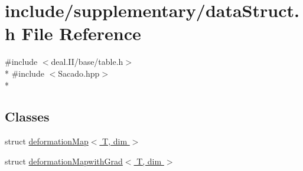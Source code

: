 \section{include/supplementary/data\-Struct.h File Reference}
\label{data_struct_8h}
{\ttfamily \#include $<$deal.\-I\-I/base/table.\-h$>$}\\*
{\ttfamily \#include $<$Sacado.\-hpp$>$}\\*
\subsection*{Classes}
\begin{DoxyCompactItemize}
\item 
struct \hyperlink{structdeformation_map}{deformation\-Map$<$ T, dim $>$}
\item 
struct \hyperlink{structdeformation_mapwith_grad}{deformation\-Mapwith\-Grad$<$ T, dim $>$}
\end{DoxyCompactItemize}
